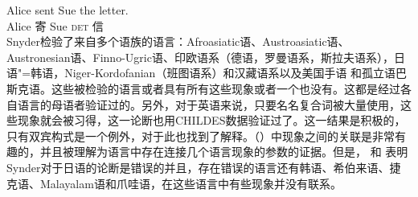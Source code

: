 \ex 
\gll Alice sent Sue the letter.\\ 
    Alice 寄 Sue \textsc{det} 信\\           
\zl 
Snyder检验了来自多个语族的语言：Afroasiatic语、Austroasiatic语、Austronesian语、Finno-Ugric语、印欧语系（德语，罗曼语系，斯拉夫语系），日语"=韩语，Niger-Kordofanian（班图语系）和汉藏语系以及美国手语 和孤立语巴斯克语。这些被检验的语言或者具有所有这些现象或者一个也没有。这都是经过各自语言的母语者验证过的。另外，对于英语来说，只要名名复合词被大量使用，这些现象就会被习得，这一论断也用CHILDES数据验证过了。这一结果是积极的，只有双宾构式是一个例外，对于此也找到了解释。（）中现象之间的关联是非常有趣的，并且被理解为语言中存在连接几个语言现象的参数的证据。但是， \citet{Son2007a}和 \citet{SonS2008a}表明Synder对于日语的论断是错误的并且，存在错误的语言还有韩语、希伯来语、捷克语、Malayalam语和爪哇语，在这些语言中有些现象并没有联系。

